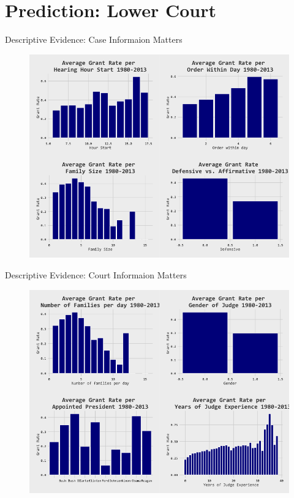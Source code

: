 \section{Prediction: Lower Court}
    
    \frame{\sectionpage}

\begin{frame}{Descriptive Evidence: Case Informaion Matters}

    \begin{figure}\label{fig:static_case}
    \centering
    \includegraphics[height = 0.7 \textheight]{images/Static_Case_Information.png}
    \end{figure}
    
\end{frame}

\begin{frame}{Descriptive Evidence: Court Informaion Matters}

    \begin{figure}\label{fig:static_court}
    \centering
    \includegraphics[height = 0.7 \textheight]{images/Static_Court_Judge.png}
    \end{figure}
    
\end{frame}

